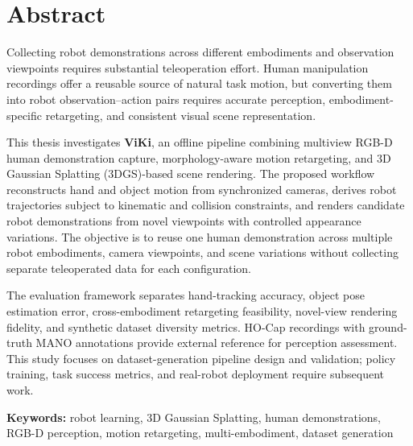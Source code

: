 \chapter*{Abstract}

Collecting robot demonstrations across different embodiments and observation
viewpoints requires substantial teleoperation effort. Human manipulation
recordings offer a reusable source of natural task motion, but converting them
into robot observation--action pairs requires accurate perception,
embodiment-specific retargeting, and consistent visual scene representation.

This thesis investigates \textbf{ViKi}, an offline pipeline combining multiview
RGB-D human demonstration capture, morphology-aware motion retargeting, and 3D
Gaussian Splatting (3DGS)-based scene rendering. The proposed workflow
reconstructs hand and object motion from synchronized cameras, derives robot
trajectories subject to kinematic and collision constraints, and renders
candidate robot demonstrations from novel viewpoints with controlled appearance
variations. The objective is to reuse one human demonstration across multiple
robot embodiments, camera viewpoints, and scene variations without collecting
separate teleoperated data for each configuration.

The evaluation framework separates hand-tracking accuracy, object pose estimation
error, cross-embodiment retargeting feasibility, novel-view rendering fidelity,
and synthetic dataset diversity metrics. HO-Cap recordings with ground-truth MANO
annotations provide external reference for perception assessment. This study
focuses on dataset-generation pipeline design and validation; policy training,
task success metrics, and real-robot deployment require subsequent work.

\vspace{1em}
\noindent
\textbf{Keywords:} robot learning, 3D Gaussian Splatting, human demonstrations,
RGB-D perception, motion retargeting, multi-embodiment, dataset generation

